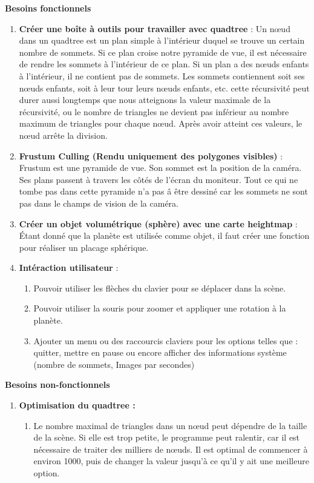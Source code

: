 \documentclass[12pt]{report}
\begin{document}
\textbf{Besoins fonctionnels}
    \begin{enumerate}
        \item \textbf{Créer une boîte à outils pour travailler avec quadtree } : 
        Un nœud dans un quadtree est un plan simple à l'intérieur duquel se trouve un certain nombre de sommets. Si ce plan croise notre pyramide de vue, il est nécessaire de rendre les sommets à l'intérieur de ce plan. Si un plan a des nœuds enfants à l'intérieur, il ne contient pas de sommets. Les sommets contiennent soit ses nœuds enfants, soit à leur tour leurs nœuds enfants, etc. cette récursivité peut durer aussi longtemps que nous atteignons la valeur maximale de la récursivité, ou le nombre de triangles ne devient pas inférieur au nombre maximum de triangles pour chaque nœud. Après avoir atteint ces valeurs, le nœud arrête la division.
        \item \textbf{Frustum Culling (Rendu uniquement des polygones visibles) } : Frustum est une pyramide de vue. Son sommet est la position de la caméra. Ses plans passent à travers les côtés de l'écran du moniteur. Tout ce qui ne tombe pas dans cette pyramide n'a pas â être dessiné car les sommets ne sont pas dans le champs de vision de la caméra.
        \item \textbf{Créer un objet volumétrique (sphère) avec une carte heightmap } :
        Étant donné que la planète est utilisée comme objet, il faut créer une fonction pour réaliser un placage sphérique.
        \item \textbf{Intéraction utilisateur} :
        \begin{enumerate}
            \item Pouvoir utiliser les flèches du clavier pour se déplacer dans la scène.
            \item Pouvoir utiliser la souris pour zoomer et appliquer une rotation à la planète.
            \item Ajouter un menu ou des raccourcis claviers pour les options telles que : quitter, mettre en pause ou encore afficher des informations système (nombre de sommets, Images par secondes)
        \end{enumerate}
    \end{enumerate}
    
\newpage

\textbf{Besoins non-fonctionnels}
    \begin{enumerate}
        \item \textbf{Optimisation du quadtree :}
            \begin{enumerate}
                \item Le nombre maximal de triangles dans un nœud peut dépendre de la taille de la scène. Si elle est trop petite, le programme peut ralentir, car il est nécessaire de traiter des milliers de nœuds. Il est optimal de commencer à environ 1000, puis de changer la valeur jusqu'à ce qu'il y ait une meilleure option.
            \end{enumerate}
    \end{enumerate}
\end{document}
